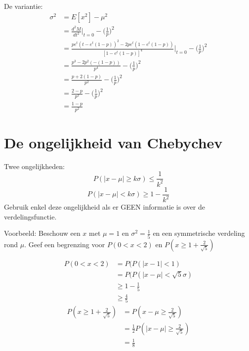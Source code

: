 \documentclass[12pt]{report}
\newcommand{\example}[2]{
      \hrulefill
      
      Voorbeeld: #1
      
      #2
      
      \hrulefill
  }
\begin{document}
{\begin{equation*}
\begin{split}
         \end{split}
        \end{equation*}
        De variantie:
        \begin{equation*}
         \begin{split}
          \sigma^2 & = E[x^2] - \mu^2 \\
                   & = \frac{d^2M}{dt^2}|_{t=0} - \bigg(\frac{1}{p}\bigg)^2 \\
                   & = \frac{pe^t(t - e^t(1 - p))^2 - 2pe^t(1 - e^t(1 - p))}{[1 - e^t(1 - p)]^4}\bigg|_{t = 0} - \bigg(\frac{1}{p}\bigg)^2 \\
                   & = \frac{p^3 - 2p^2(-(1-p))}{p^4} - \bigg(\frac{1}{p}\bigg)^2 \\
                   & = \frac{p + 2(1 - p)}{p^2} - \bigg(\frac{1}{p}\bigg)^2 \\
                   & = \frac{2 - p}{p^2} - \bigg(\frac{1}{p}\bigg)^2 \\
                & = \frac{1 - p}{p^2}
         \end{split}
        \end{equation*}

    }
\section{De ongelijkheid van Chebychev}
Twee ongelijkheden:
$$P(|x - \mu| \geq k\sigma) \leq \frac{1}{k^2}$$
$$P(|x - \mu| < k\sigma) \geq 1 - \frac{1}{k^2}$$
Gebruik enkel deze ongelijkheid als er GEEN informatie is over de verdelingsfunctie.
\example{
    Beschouw een $x$ met $\mu = 1$ en $\sigma^2 = \frac{1}{5}$ en  een symmetrische verdeling rond $\mu$.
    Geef een begrenzing voor $P(0 < x < 2)$ en $P(x \geq 1 + \frac{2}{\sqrt{5}})$
}{
    \begin{equation*}
     \begin{split}
      P(0 < x < 2) & = P(P(|x - 1| < 1) \\
                   & = P(P(|x - \mu| < \sqrt{5}\sigma) \\
                   & \geq 1 - \frac{1}{5} \\
                   & \geq \frac{4}{5}
     \end{split}
    \end{equation*}
    \begin{equation*}
     \begin{split}
      P(x \geq 1 + \frac{2}{\sqrt{5}}) & = P(x - \mu \geq \frac{2}{\sqrt{5}}) \\
                                       & = \frac{1}{2}P(|x - \mu| \geq \frac{2}{\sqrt{5}}) \\
                                       & = \frac{1}{8}
     \end{split}
    \end{equation*}
}
\end{document}
